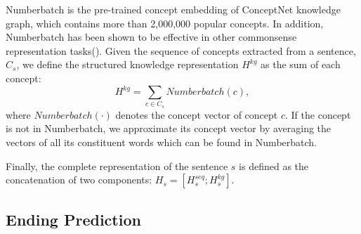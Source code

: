 Numberbatch
is the pre-trained concept embedding of ConceptNet knowledge graph,
which contains more than 2,000,000 popular concepts. In addition, 
Numberbatch has been shown to be effective in other 
commonsense representation tasks(\citeauthor{speer2017conceptnet_2}). 
Given the sequence of concepts extracted from a sentence, $C_s$,
we define the structured knowledge representation $H^{kg}$
as the sum of each concept:
\begin{equation}
  H^{kg} = \sum_{c \in C_s}{Numberbatch(c)},
\end{equation}
\noindent
where $Numberbatch(\cdot)$ denotes the concept vector of concept $c$.
If the concept is not in Numberbatch, we approximate its concept vector
by averaging the vectors of all its constituent words which can be found 
in Numberbatch.

Finally, the complete representation of the sentence $s$ is defined as
the concatenation of two components: $H_s=[H_s^{seq}; H_s^{kg}]$.

%
%

\subsection{Ending Prediction}
\label{sec:classifier}

